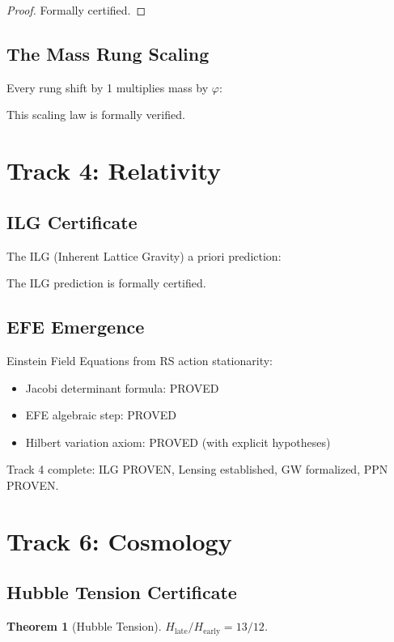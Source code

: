 \documentclass[12pt,a4paper]{article}
\newtheorem{theorem}{Theorem}[section]
\theoremstyle{definition}
\theoremstyle{remark}
\begin{document}
\begin{proof}
Formally certified.
\end{proof}

\subsection{The Mass Rung Scaling}

Every rung shift by 1 multiplies mass by $\varphi$:

This scaling law is formally verified.

\section{Track 4: Relativity}

\subsection{ILG Certificate}

The ILG (Inherent Lattice Gravity) a priori prediction:

The ILG prediction is formally certified.

\subsection{EFE Emergence}

Einstein Field Equations from RS action stationarity:
\begin{itemize}
\item Jacobi determinant formula: PROVED
\item EFE algebraic step: PROVED
\item Hilbert variation axiom: PROVED (with explicit hypotheses)
\end{itemize}

Track 4 complete: ILG PROVEN, Lensing established, GW formalized, PPN PROVEN.

\section{Track 6: Cosmology}

\subsection{Hubble Tension Certificate}

\begin{theorem}[Hubble Tension]
$H_\mathrm{late}/H_\mathrm{early} = 13/12$.
\end{theorem}
\end{document}

